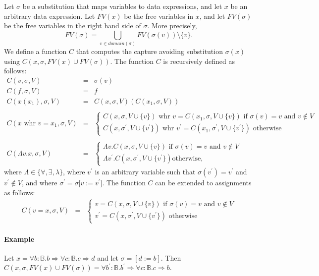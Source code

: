 \documentclass{article}
\begin{document}
Let $\sigma $ be a substitution that maps variables to data expressions, and
let $x$ be an arbitrary data expression. Let $FV(x)$ be the free variables
in $x$, and let $FV(\sigma )$ be the free variables in the right hand side
of $\sigma $. More precisely,%
\[
FV(\sigma )=\bigcup_{v\in domain(\sigma )}FV(\sigma (v))\setminus \{v\}.
\]%
We define a function $C$ that computes the capture avoiding substitution $%
\sigma (x)$ using $C(x,\sigma ,FV(x)\cup FV(\sigma ))$. The function $C$ is
recursively defined as follows:%
\[
\begin{array}{lll}
C(v,\sigma ,V) & = & \sigma (v) \\ 
C(f,\sigma ,V) & = & f \\ 
C(x(x_{1}),\sigma ,V) & = & C(x,\sigma ,V)(C(x_{1},\sigma ,V)) \\ 
&  &  \\ 
C(x\text{ whr }v=x_{1},\sigma ,V) & = & \left\{ 
\begin{array}{l}
C(x,\sigma ,V\cup \{v\})\text{ whr }v=C(x_{1},\sigma ,V\cup \{v\})\text{ if }%
\sigma (v)=v\text{ and }v\notin V \\ 
C(x,\sigma ^{\prime },V\cup \{v^{\prime }\})\text{ whr }v^{\prime
}=C(x_{1},\sigma ^{\prime },V\cup \{v^{\prime }\})\text{ otherwise}%
\end{array}%
\right.  \\ 
&  &  \\ 
C(\Lambda v.x,\sigma ,V) & = & \left\{ 
\begin{array}{l}
\Lambda v.C(x,\sigma ,V\cup \{v\})\text{ if }\sigma (v)=v\text{ and }v\notin
V \\ 
\Lambda v^{\prime }.C(x,\sigma ^{\prime },V\cup \{v^{\prime }\})\text{
otherwise,}%
\end{array}%
\right. 
\end{array}%
\]%
where $\Lambda \in \{\forall ,\exists ,\lambda \}$, where $v^{\prime }$ is
an arbitrary variable such that $\sigma (v^{\prime })=v^{\prime }$ and $%
v^{\prime }\notin V$, and where $\sigma ^{\prime }=\sigma \lbrack
v:=v^{\prime }]$. The function $C$ can be extended to assignments as follows:%
\[
\begin{array}{lll}
C(v=x,\sigma ,V) & = & \left\{ 
\begin{array}{l}
v=C(x,\sigma ,V\cup \{v\})\text{ if }\sigma (v)=v\text{ and }v\notin V \\ 
v^{\prime }=C(x,\sigma ^{\prime },V\cup \{v^{\prime }\})\text{ otherwise}%
\end{array}%
\right. 
\end{array}%
\]

\paragraph{Example}

Let $x=\forall b:\mathbb{B}.b\Rightarrow \forall c:\mathbb{B}.c\Rightarrow d$
and let $\sigma =[d:=b]$. Then $C(x,\sigma ,FV(x)\cup FV(\sigma ))=\forall
b^{\prime }:\mathbb{B}.b^{\prime }\Rightarrow \forall c:\mathbb{B}%
.c\Rightarrow b$.
\end{document}
